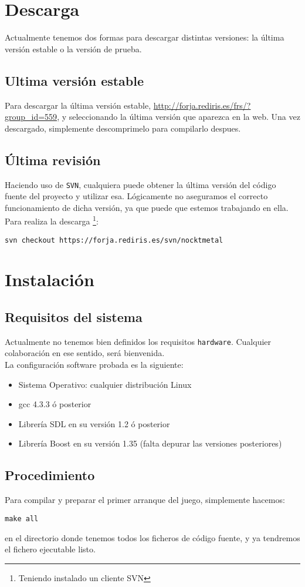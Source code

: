 \section{Descarga}

Actualmente tenemos dos formas para descargar distintas versiones: la última
versión estable o la versión de prueba.

\subsection*{Ultima versión estable}

Para descargar la última versión estable, \url{http://forja.rediris.es/frs/?group_id=559}, 
y seleccionando la última versión que aparezca en la web. Una vez descargado,
simplemente descomprimelo para compilarlo despues.

\subsection*{Última revisión}

Haciendo uso de \texttt{SVN}, cualquiera puede obtener la última versión del
código fuente del proyecto y utilizar esa. Lógicamente no aseguramos el
correcto funcionamiento de dicha versión, ya que puede que estemos trabajando
en ella.\\

Para realiza la descarga \footnote{Teniendo instalado un cliente SVN}:

\begin{lstlisting}[style=consola]
svn checkout https://forja.rediris.es/svn/nocktmetal
\end{lstlisting}

\section{Instalación}

\subsection*{Requisitos del sistema}

Actualmente no tenemos bien definidos los requisitos \texttt{hardware}. 
Cualquier colaboración en ese sentido, será bienvenida.\\

La configuración software probada es la siguiente:

\begin{itemize}
\item Sistema Operativo: cualquier distribución Linux
\item gcc 4.3.3 ó posterior  
\item Librería SDL en su versión 1.2 ó posterior
\item Librería Boost en su versión 1.35 (falta depurar las versiones posteriores)
\end{itemize}

\subsection*{Procedimiento}

Para compilar y preparar el primer arranque del juego, simplemente hacemos:

\begin{lstlisting}[style=consola]
make all
\end{lstlisting}

en el directorio donde tenemos todos los ficheros de código fuente, y ya tendremos
el fichero ejecutable listo. 
